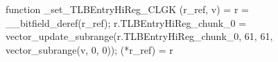 function _set_TLBEntryHiReg_CLGK (r_ref, v) = {
    r = __bitfield_deref(r_ref);
    r.TLBEntryHiReg_chunk_0 = vector_update_subrange(r.TLBEntryHiReg_chunk_0, 61, 61, vector_subrange(v, 0, 0));
    (*r_ref) = r
}
